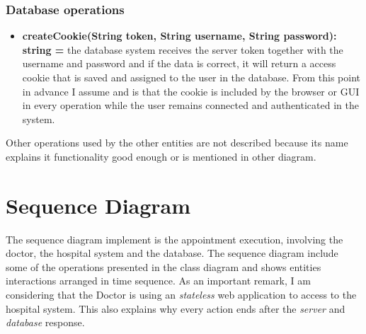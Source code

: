 \documentclass{article}
\begin{document}
            \subsubsection{Database operations}
            \begin{itemize}

                \item \textbf{createCookie(String token, String username, String password): string = } the database system receives the server token together with the username and password and if the data is correct, it will return a access cookie that is saved and assigned to the user in the database.
                From this point in advance I assume and is that the cookie is included by the browser or GUI in every operation while the user remains connected and authenticated in the system.
            \end{itemize}

            Other operations used by the other entities are not described because its name explains it functionality good enough or is mentioned in other diagram.

            
            \section{Sequence Diagram}
            The sequence diagram implement is the appointment execution, involving the doctor, the hospital system and the database. The sequence diagram include some of the operations presented in the class diagram and shows entities interactions arranged in time sequence. As an important remark, I am considering that the
            Doctor is using an \textit{stateless} web application to access to the hospital system. This also explains why every action ends after the \textit{server} and \textit{database} response.
\end{document}
